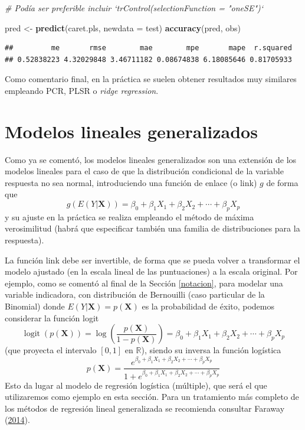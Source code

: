 \documentclass[
  spanish,
]{book}
\newenvironment{Shaded}{\begin{snugshade}}{\end{snugshade}}
\newcommand{\CommentTok}[1]{\textcolor[rgb]{0.56,0.35,0.01}{\textit{#1}}}
\newcommand{\DataTypeTok}[1]{\textcolor[rgb]{0.13,0.29,0.53}{#1}}
\newcommand{\KeywordTok}[1]{\textcolor[rgb]{0.13,0.29,0.53}{\textbf{#1}}}
\newcommand{\NormalTok}[1]{#1}
\newcommand{\StringTok}[1]{\textcolor[rgb]{0.31,0.60,0.02}{#1}}
\theoremstyle{break}
\theoremstyle{definition}
\theoremstyle{definition}
\theoremstyle{definition}
\theoremstyle{remark}
\begin{document}
\begin{Shaded}
\begin{Highlighting}[]
\CommentTok{# Podía ser preferible incluir `trControl(selectionFunction = "oneSE")`}

\NormalTok{pred <-}\StringTok{ }\KeywordTok{predict}\NormalTok{(caret.pls, }\DataTypeTok{newdata =}\NormalTok{ test)}
\KeywordTok{accuracy}\NormalTok{(pred, obs)}
\end{Highlighting}
\end{Shaded}

\begin{verbatim}
##         me       rmse        mae        mpe       mape  r.squared 
## 0.52838223 4.32029848 3.46711182 0.08674838 6.18085646 0.81705933
\end{verbatim}

Como comentario final, en la práctica se suelen obtener resultados muy similares empleando PCR, PLSR o \emph{ridge regression}.

\hypertarget{reg-glm}{%
\section{Modelos lineales generalizados}\label{reg-glm}}

Como ya se comentó, los modelos lineales generalizados son una extensión de los modelos lineales para el caso de que la distribución condicional de la variable respuesta no sea normal, introduciendo una función de enlace (o link) \(g\) de forma que
\[g\left(E(Y | \mathbf{X} )\right) = \beta_{0}+\beta_{1}X_{1}+\beta_{2}X_{2}+\cdots+\beta_{p}X_{p}\]
y su ajuste en la práctica se realiza empleando el método de máxima verosimilitud (habrá que especificar también una familia de distribuciones para la respuesta).

La función link debe ser invertible, de forma que se pueda volver a transformar el modelo ajustado (en la escala lineal de las puntuaciones) a la escala original.
Por ejemplo, como se comentó al final de la Sección \ref{notacion}, para modelar una variable indicadora, con distribución de Bernouilli (caso particular de la Binomial) donde \(E(Y | \mathbf{X} ) = p(\mathbf{X})\) es la probabilidad de éxito, podemos considerar la función logit
\[\operatorname{logit}(p(\mathbf{X}))=\log\left( \frac{p(\mathbf{X})}{1-p(\mathbf{X})} \right) = \beta_{0}+\beta_{1}X_{1}+\beta_{2}X_{2}+\cdots+\beta_{p}X_{p}\]
(que proyecta el intervalo \([0, 1]\) en \(\mathbb{R}\)), siendo su inversa la función logística
\[p(\mathbf{X}) = \frac{e^{\beta_{0}+\beta_{1}X_{1}+\beta_{2}X_{2}+\cdots+\beta_{p}X_{p}}}{1 + e^{\beta_{0}+\beta_{1}X_{1}+\beta_{2}X_{2}+\cdots+\beta_{p}X_{p}}}\]
Esto da lugar al modelo de regresión logística (múltiple), que será el que utilizaremos como ejemplo en esta sección.
Para un tratamiento más completo de los métodos de regresión lineal generalizada se recomienda consultar Faraway (\protect\hyperlink{ref-faraway2014linear}{2014}).
\end{document}
